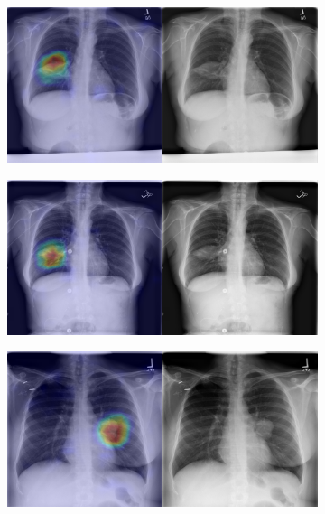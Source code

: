 \begin{figure}[b]
    \centering
    \begin{subfigure}{0.4\textwidth}
        \centering
        \includegraphics[width=1.0\textwidth]{Chapters/5. Conclusiones/img/Mass/1_1_00000618_001.png}
    \end{subfigure}
    \begin{subfigure}{0.4\textwidth}
        \centering
        \includegraphics[width=1.0\textwidth]{Chapters/5. Conclusiones/img/Mass/1_1_00000618_006.png}
    \end{subfigure}
    \begin{subfigure}{0.4\textwidth}
        \centering
        \includegraphics[width=1.0\textwidth]{Chapters/5. Conclusiones/img/Mass/1_1_00001248_018.png}

\end{subfigure}
\end{figure}
